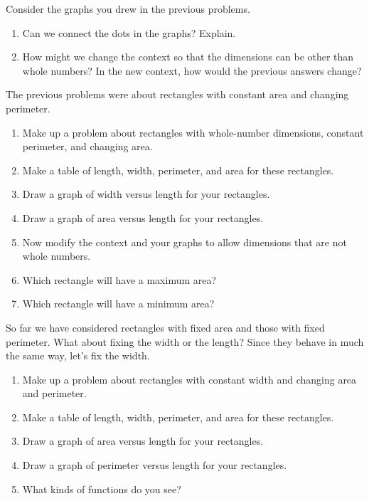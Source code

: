 \begin{prob}  Consider the graphs you drew in the previous problems.  
\begin{enumerate}
\item Can we connect the dots in the graphs?  Explain. 
\item How might we change the context so that the dimensions can be other than whole numbers?   In the new context, how would the previous answers change?
\end{enumerate}
\end{prob}

\begin{prob}
The previous problems were about rectangles with constant area and changing perimeter.  
\begin{enumerate}
\item Make up a problem about rectangles with whole-number dimensions, constant perimeter, and changing area.   
\item Make a table of length, width, perimeter, and area for these rectangles.
\item Draw a graph of width versus length for your rectangles. 
\item Draw a graph of area versus length for your rectangles.  
\item Now modify the context and your graphs to allow dimensions that are not whole numbers.   
\item Which rectangle will have a maximum area? 
\item Which rectangle will have a minimum area? 
\end{enumerate}
\end{prob}

\begin{prob}
So far we have considered rectangles with fixed area and those with fixed perimeter.  What about fixing the width or the length?  Since they behave in much the same way, let's fix the width.   
\begin{enumerate}
\item Make up a problem about rectangles with constant width and changing area and perimeter.   
\item Make a table of length, width, perimeter, and area for these rectangles.
\item Draw a graph of area versus length for your rectangles.  
\item Draw a graph of perimeter versus length for your rectangles. 
\item What kinds of functions do you see?  
\end{enumerate}
\end{prob}

